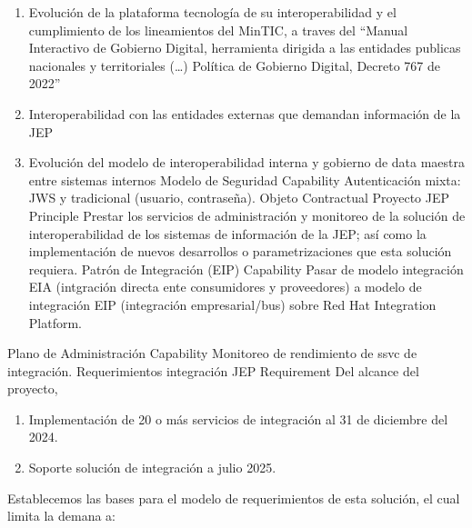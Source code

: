 \documentclass[
  paper=a4,
  ,captions=tableheading
]{scrartcl}
\providecommand{\tightlist}{%
  \setlength{\itemsep}{0pt}\setlength{\parskip}{0pt}}
\begin{document}
\begin{enumerate}
\def\labelenumi{\arabic{enumi}.}
\tightlist
\item
  Evolución de la plataforma tecnología de su interoperabilidad y el
  cumplimiento de los lineamientos del MinTIC, a traves del ``Manual
  Interactivo de Gobierno Digital, herramienta dirigida a las entidades
  publicas nacionales y territoriales (\ldots) Política de Gobierno
  Digital, Decreto 767 de 2022''
\item
  Interoperabilidad con las entidades externas que demandan información
  de la JEP
\item
  Evolución del modelo de interoperabilidad interna y gobierno de data
  maestra entre sistemas internos \textbar{} \textbar{} Modelo de
  Seguridad \textbar{} Capability \textbar{} Autenticación mixta: JWS y
  tradicional (usuario, contraseña). \textbar{} \textbar{} Objeto
  Contractual Proyecto JEP \textbar{} Principle \textbar{} Prestar los
  servicios de administración y monitoreo de la solución de
  interoperabilidad de los sistemas de información de la JEP; así como
  la implementación de nuevos desarrollos o parametrizaciones que esta
  solución requiera. \textbar{} \textbar{} Patrón de Integración (EIP)
  \textbar{} Capability \textbar{} Pasar de modelo integración EIA
  (intgración directa ente consumidores y proveedores) a modelo de
  integración EIP (integración empresarial/bus) sobre Red Hat
  Integration Platform.
\end{enumerate}

\textbar{} \textbar{} Plano de Administración \textbar{} Capability
\textbar{} Monitoreo de rendimiento de ssvc de integración. \textbar{}
\textbar{} Requerimientos integración JEP \textbar{} Requirement
\textbar{} Del alcance del proyecto,

\begin{enumerate}
\def\labelenumi{\arabic{enumi}.}
\tightlist
\item
  Implementación de 20 o más servicios de integración al 31 de diciembre
  del 2024.
\item
  Soporte solución de integración a julio 2025.
\end{enumerate}

Establecemos las bases para el modelo de requerimientos de esta
solución, el cual limita la demana a:
\end{document}
